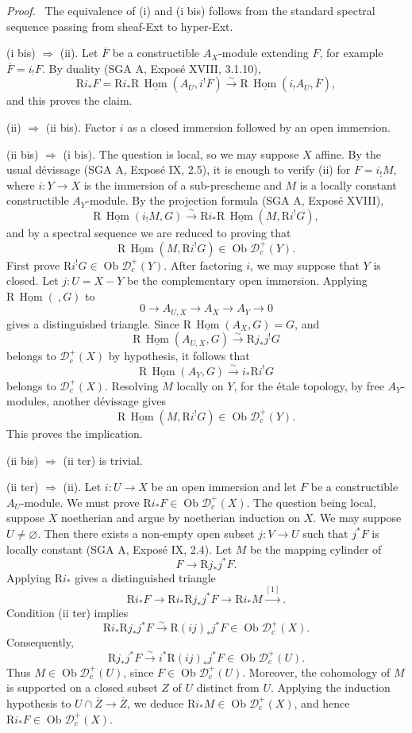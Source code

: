\documentclass[11pt]{article}
\theoremstyle{plain}
\theoremstyle{definition}
\theoremstyle{remark}
\newenvironment{prooftext}{\par\noindent\textit{Proof.}\ }{\par\medskip}
\newcommand{\D}{\mathcal D}\newcommand{\E}{\mathcal E}\newcommand{\F}{\mathcal F}
\DeclareMathOperator{\Hom}{Hom}
\DeclareMathOperator{\ob}{Ob}
\newcommand{\ol}[1]{\overline{#1}}
\newcommand{\R}{\mathrm R}
\begin{document}
\begin{prooftext}
The equivalence of (i) and (i bis) follows from the standard spectral sequence passing from sheaf-Ext to hyper-Ext.

(i bis) $\Rightarrow$ (ii). Let $\ol F$ be a constructible $A_X$-module extending $F$, for example $\ol F=i_!F$. By duality (SGA A, Exposé XVIII, 3.1.10),
\[
   \R i_*F
    =\R i_*\R\,\underline{\Hom}(A_U,i^!\ol F)
    \xrightarrow{\sim}
      \R\,\underline{\Hom}(i_!A_U,\ol F),
\]
and this proves the claim.

(ii) $\Rightarrow$ (ii bis). Factor $i$ as a closed immersion followed by an open immersion.

(ii bis) $\Rightarrow$ (i bis). The question is local, so we may suppose $X$ affine. By the usual dévissage (SGA A, Exposé IX, 2.5), it is enough to verify (ii) for $F=i_!M$, where $i:Y\to X$ is the immersion of a sub-prescheme and $M$ is a locally constant constructible $A_Y$-module. By the projection formula (SGA A, Exposé XVIII),
\[
   \R\,\underline{\Hom}(i_!M,G)
      \xrightarrow{\sim}
   \R i_*\R\,\underline{\Hom}(M,\R i^!G),
\]
and by a spectral sequence we are reduced to proving that
\[
   \R\,\underline{\Hom}(M,\R i^!G)\in\ob\D_c^+(Y).
\]
First prove $\R i^!G\in\ob\D_c^+(Y)$. After factoring $i$, we may suppose that $Y$ is closed. Let $j:U=X-Y$ be the complementary open immersion. Applying $\R\,\underline{\Hom}(\ ,G)$ to
\[
   0\longrightarrow A_{U,X}\longrightarrow A_X\longrightarrow A_Y\longrightarrow0
\]
gives a distinguished triangle. Since $\R\,\underline{\Hom}(A_X,G)=G$, and
\[
   \R\,\underline{\Hom}(A_{U,X},G)\xrightarrow{\sim}\R j_*j^!G
\]
belongs to $\D_c^+(X)$ by hypothesis, it follows that
\[
   \R\,\underline{\Hom}(A_Y,G)\xrightarrow{\sim}i_*\R i^!G
\]
belongs to $\D_c^+(X)$. Resolving $M$ locally on $Y$, for the étale topology, by free $A_Y$-modules, another dévissage gives
\[
   \R\,\underline{\Hom}(M,\R i^!G)\in\ob\D_c^+(Y).
\]
This proves the implication.

(ii bis) $\Rightarrow$ (ii ter) is trivial.

(ii ter) $\Rightarrow$ (ii). Let $i:U\to X$ be an open immersion and let $F$ be a constructible $A_U$-module. We must prove $\R i_*F\in\ob\D_c^+(X)$. The question being local, suppose $X$ noetherian and argue by noetherian induction on $X$. We may suppose $U\ne\varnothing$. Then there exists a non-empty open subset $j:V\to U$ such that $j^*F$ is locally constant (SGA A, Exposé IX, 2.4). Let $M$ be the mapping cylinder of
\[
   F\longrightarrow \R j_*j^*F.
\]
Applying $\R i_*$ gives a distinguished triangle
\[
   \R i_*F\longrightarrow \R i_*\R j_*j^*F
       \longrightarrow \R i_*M\xrightarrow{[1]}.
\]
Condition (ii ter) implies
\[
   \R i_*\R j_*j^*F\xrightarrow{\sim}\R(ij)_*j^*F\in\ob\D_c^+(X).
\]
Consequently,
\[
   \R j_*j^*F\xrightarrow{\sim}i^*\R(ij)_*j^*F\in\ob\D_c^+(U).
\]
Thus $M\in\ob\D_c^+(U)$, since $F\in\ob\D_c^+(U)$. Moreover, the cohomology of $M$ is supported on a closed subset $Z$ of $U$ distinct from $U$. Applying the induction hypothesis to $U\cap\ol Z\to\ol Z$, we deduce $\R i_*M\in\ob\D_c^+(X)$, and hence $\R i_*F\in\ob\D_c^+(X)$.


\end{prooftext}
\end{document}
